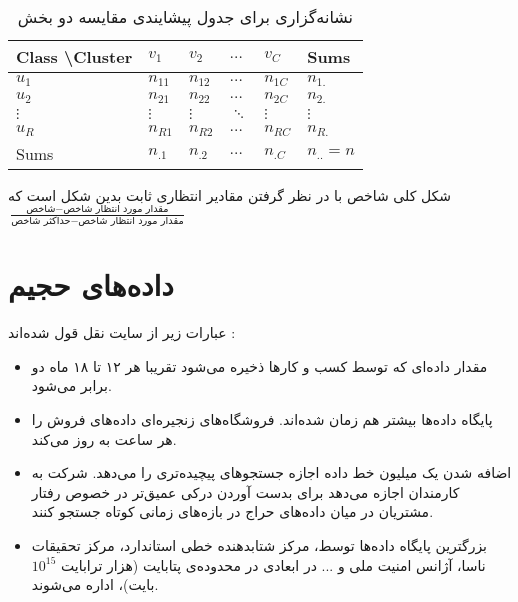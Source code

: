 \begin{table}[h]
\caption{
نشانه‌گزاری برای جدول پیشایندی مقایسه دو بخش
}
\centering
\bigskip
\begin{latin}
\begin{tabular}{l|llll|l}
Class \textbackslash Cluster & $v_1$    & $v_2$  & $\ldots$ & $v_C$  & Sums      \\ \hline
$u_1$                        & $n_{11}$ & $n_{12}$ & $\ldots$ & $n_{1C}$ & $n_{1.}$     \\
$u_2$                        & $n_{21}$ & $n_{22}$ & $\ldots$ & $n_{2C}$ & $n_{2.}$     \\
$\vdots$                     & $\vdots$ & $\vdots$ & $\ddots$ & $\vdots$ & $\vdots$     \\
$u_R$                        & $n_{R1}$ & $n_{R2}$ & $\ldots$ & $n_{RC}$ & $n_{R.}$     \\ \hline
Sums                         & $n_{.1}$ & $n_{.2}$ & $\ldots$ & $n_{.C}$ & $n_{..} = n$
\end{tabular}
\end{latin}
\label{tab:1iY}
\end{table}

شکل کلی شاخص با در نظر گرفتن مقادیر انتظاری ثابت بدین شکل است که 
$\frac{\text{شاخص} - \text{مقدار مورد انتظار شاخص} }
{\text{حداکثر شاخص} - \text{مقدار مورد انتظار شاخص} }$



\cite{yeung2001details}

\section{داده‌های حجیم}
عبارات زیر از سایت 
نقل قول شده‌اند
\cite{site_iw}
:

\begin{itemize}
\item
مقدار داده‌ای که توسط کسب و کارها ذخیره می‌شود تقریبا هر ۱۲ تا ۱۸ ماه دو برابر می‌شود.
\item
پایگاه داده‌ها بیشتر هم ‌زمان شده‌اند. فروشگاه‌های زنجیره‌ای 
داده‌های فروش را هر ساعت به روز می‌کند.
\item
اضافه شدن یک میلیون خط داده اجازه جستجوهای پیچیده‌تری را می‌دهد. شرکت 
به کارمندان اجازه می‌دهد برای بدست آوردن درکی عمیق‌تر در خصوص رفتار مشتریان در میان داده‌های حراج در بازه‌های زمانی کوتاه جستجو کنند.
\item
بزرگترین پایگاه داده‌ها توسط، مرکز شتابدهنده خطی استاندارد، مرکز تحقیقات ناسا، آژانس امنیت ملی و ... در ابعادی در محدوده‌ی پتابایت (هزار ترابایت 
$10^15$
بایت)، اداره می‌شوند.
\end{itemize}

